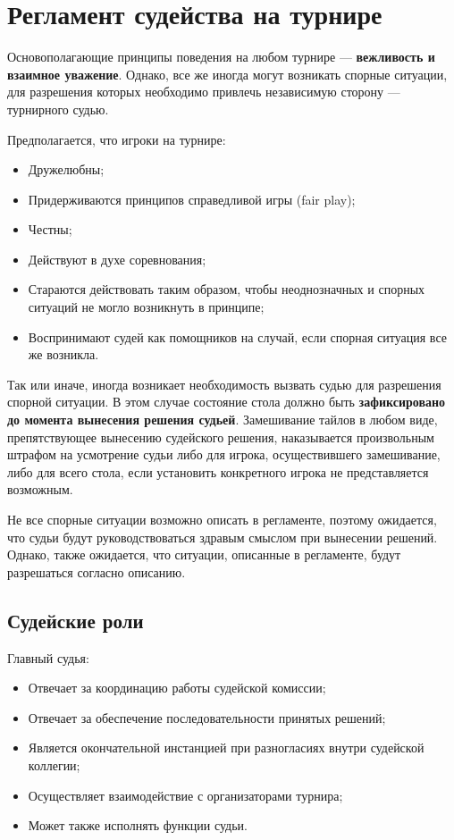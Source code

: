 \section{Регламент судейства на турнире}

Основополагающие принципы поведения на любом турнире --- \textbf{вежливость и взаимное уважение}. Однако, все же иногда могут возникать спорные ситуации, для разрешения которых необходимо привлечь независимую сторону --- турнирного судью.

Предполагается, что игроки на турнире:
\begin{itemize}
	\item Дружелюбны;
	\item Придерживаются принципов справедливой игры (fair play);
	\item Честны;
	\item Действуют в духе соревнования;
	\item Стараются действовать таким образом, чтобы неоднозначных и спорных ситуаций не могло возникнуть в принципе;
	\item Воспринимают судей как помощников на случай, если спорная ситуация все же возникла.
\end{itemize}

Так или иначе, иногда возникает необходимость вызвать судью для разрешения спорной ситуации. В этом случае состояние стола должно быть \textbf{зафиксировано до момента вынесения решения судьей}. Замешивание тайлов в любом виде, препятствующее вынесению судейского решения, наказывается произвольным штрафом на усмотрение судьи либо для игрока, осуществившего замешивание, либо для всего стола, если установить конкретного игрока не представляется возможным.

Не все спорные ситуации возможно описать в регламенте, поэтому ожидается, что судьи будут руководствоваться здравым смыслом при вынесении решений. Однако, также ожидается, что ситуации, описанные в регламенте, будут разрешаться согласно описанию.

\subsection{Судейские роли}

Главный судья:
\begin{itemize}
	\item Отвечает за координацию работы судейской комиссии;
	\item Отвечает за обеспечение последовательности принятых решений;
	\item Является окончательной инстанцией при разногласиях внутри судейской коллегии;
	\item Осуществляет взаимодействие с организаторами турнира;
	\item Может также исполнять функции судьи.
\end{itemize}

